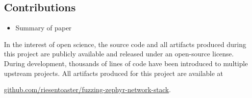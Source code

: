 \documentclass{article}
\begin{document}
\begin{multicols}{2}
  \subsection{Contributions}
  \begin{itemize}
    \item Summary of paper
  \end{itemize}

\end{multicols}
\vspace{30px}
\begin{center}
  \begin{minipage}{0.75\textwidth}
    \centering
    In the interest of open science, the source code and all artifacts produced during this project are publicly available and released under an open-source license. During development, thousands of lines of code have been introduced to multiple upstream projects. All artifacts produced for this project are available at

    \vspace{8px}

    \href{https://github.com/riesentoaster/fuzzing-zephyr-network-stack}{github.com/riesentoaster/fuzzing-zephyr-network-stack}.
  \end{minipage}
\end{center}

\vspace{50px}

\end{document}
